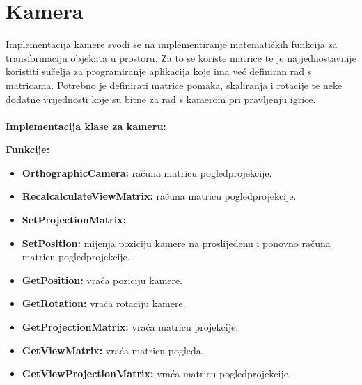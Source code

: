 \documentclass{mathos}
\begin{document}
\section{Kamera}
Implementacija kamere svodi se na implementiranje matematičkih funkcija za transformaciju objekata u prostoru. Za to se koriste matrice te je najjednostavnije koristiti
sučelja za programiranje aplikacija koje ima već definiran rad s matricama. Potrebno je definirati matrice pomaka, skaliranja i rotacije te neke dodatne vrijednosti koje su bitne
za rad s kamerom pri pravljenju igrice.
\\ \\
\textbf{Implementacija klase za kameru:}

\textbf{Funkcije: }
\begin{itemize}
    \item \textbf{OrthographicCamera:} računa matricu pogledprojekcije.
    \item \textbf{RecalcalculateViewMatrix:} računa matricu pogledprojekcije.
    \item \textbf{SetProjectionMatrix:}
    \item \textbf{SetPosition:} mijenja poziciju kamere na proslijeđenu i ponovno računa matricu pogledprojekcije.
    \item \textbf{GetPosition:} vraća poziciju kamere.
    \item \textbf{GetRotation:} vraća rotaciju kamere.
    \item \textbf{GetProjectionMatrix:} vraća matricu projekcije.
    \item \textbf{GetViewMatrix:} vraća matricu pogleda.
    \item \textbf{GetViewProjectionMatrix:} vraća matricu pogledprojekcije.
\end{itemize}
\end{document}
